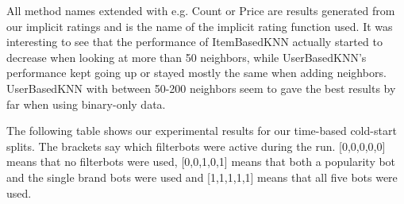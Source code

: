 All method names extended with e.g. Count or Price are results generated from our implicit ratings and is the name of the implicit rating function used.
It was interesting to see that the performance of ItemBasedKNN actually started to decrease when looking at more than 50 neighbors, while UserBasedKNN's performance kept going up or stayed mostly the same when adding
neighbors. UserBasedKNN with between 50-200 neighbors seem to gave the best results by far when using binary-only data.

The following table shows our experimental results for our time-based cold-start splits. The brackets say which filterbots were active during the run.
[0,0,0,0,0] means that no filterbots were used, [0,0,1,0,1] means that both a popularity bot and the single brand bots were used and [1,1,1,1,1] means that all five bots were used.

